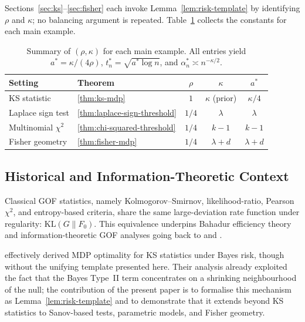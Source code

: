 \documentclass[11pt]{article}
\newcommand{\KL}{\mathrm{KL}}
\newcommand{\rhotail}{\rho}  %
\newcommand{\1}{\mathbf{1}}
\theoremstyle{plain}
\theoremstyle{definition}
\theoremstyle{remark}
\begin{document}
\medskip
\noindent
Sections~\ref{sec:ks}--\ref{sec:fisher} each invoke Lemma~\ref{lem:risk-template} by identifying $\rhotail$ and $\kappa$; no balancing argument is repeated.
Table~\ref{tab:constants} collects the constants for each main example.

\begin{table}[!ht]
\centering
\caption{Summary of $(\rhotail,\kappa)$ for each main example.  All entries yield $a^{*}=\kappa/(4\rhotail)$, $t_n^{*}=\sqrt{a^{*}\log n}$, and $\alpha_n^{*}\asymp n^{-\kappa/2}$.}\label{tab:constants}
\smallskip
\begin{tabular}{llccc}
\toprule
\textbf{Setting} & \textbf{Theorem} & $\rhotail$ & $\kappa$ & $a^{*}$ \\
\midrule
KS statistic                & \ref{thm:ks-mdp}                & $1$   & $\kappa$ (prior)     & $\kappa/4$ \\
Laplace sign test           & \ref{thm:laplace-sign-threshold}& $1/4$ & $\lambda$           & $\lambda$ \\
Multinomial $\chi^2$        & \ref{thm:chi-squared-threshold} & $1/4$ & $k-1$               & $k-1$ \\
Fisher geometry             & \ref{thm:fisher-mdp}            & $1/4$ & $\lambda+d$         & $\lambda+d$ \\
\bottomrule
\end{tabular}
\end{table}


\subsection{Historical and Information-Theoretic Context}\label{subsec:history}

Classical GOF statistics, namely Kolmogorov--Smirnov, likelihood-ratio, Pearson $\chi^2$, and entropy-based criteria, share the same large-deviation rate function under regularity: $\KL(G\|F_0)$.
This equivalence underpins Bahadur efficiency theory \citep{Bahadur1960, BahadurRao1960} and information-theoretic GOF analyses going back to \citet{Good1955} and \citet{Jaynes1957}.

\citet{RubinSethuraman1965a, RubinSethuraman1965b} effectively derived MDP optimality for KS statistics under Bayes risk, though without the unifying template presented here.
Their analysis already exploited the fact that the Bayes Type~II term concentrates on a shrinking neighbourhood of the null; the contribution of the present paper is to formalise this mechanism as Lemma~\ref{lem:risk-template} and to demonstrate that it extends beyond KS statistics to Sanov-based tests, parametric models, and Fisher geometry.
\end{document}
